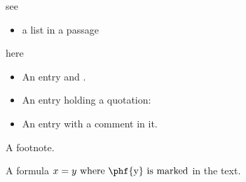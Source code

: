 \phf see \begin{itemize}\item a list in a passage\end{itemize} here \endphf

\begin{itemize}
\item An entry  and \phf[remarked].
\item An entry holding a quotation:
\begin{quote}\end{quote}
\item An entry with a comment  in it.
\end{itemize}

A footnote.

A formula \(x = y \text{ where \phf{y} is marked}\) in the text.

